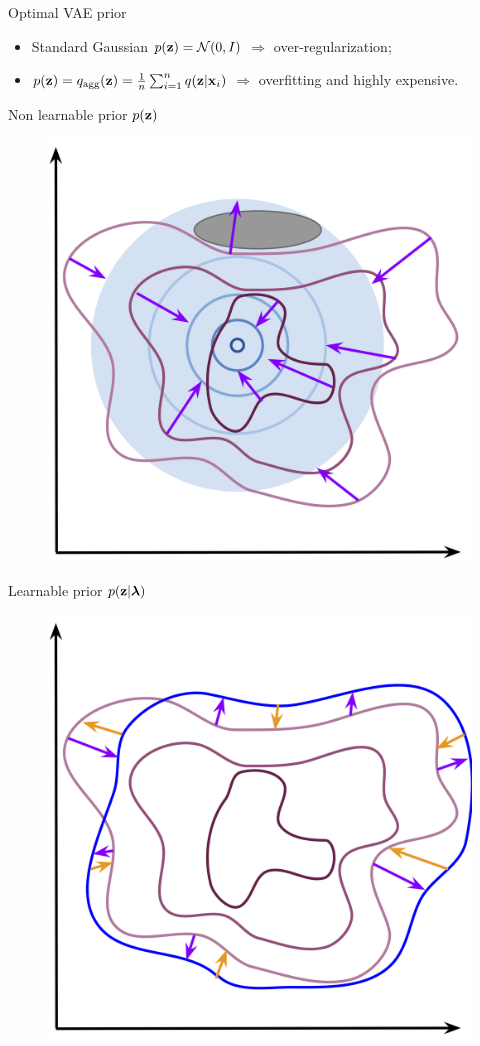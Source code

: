 \begin{frame}{Optimal VAE prior}
	\begin{itemize}
		\item Standard Gaussian $p(\mathbf{z}) = \mathcal{N}(0, I)$ $\Rightarrow$ over-regularization;
		\item $p(\mathbf{z}) = q_{\text{agg}}(\mathbf{z}) = \frac{1}{n}\sum_{i=1}^n q(\mathbf{z} | \mathbf{x}_i)$ $\Rightarrow$ overfitting and highly expensive.
	\end{itemize}
	\vspace{-0.5cm}
	\begin{minipage}[t]{0.5\columnwidth}
		\begin{block}{Non learnable prior $p(\mathbf{z})$}
			\begin{figure}[h]
				\centering
				\includegraphics[width=0.6\linewidth]{figs/non_learnable_prior}
			\end{figure}
		\end{block}
	\end{minipage}%
	\begin{minipage}[t]{0.5\columnwidth}
		\begin{block}{Learnable prior $p(\mathbf{z} | \boldsymbol{\lambda})$}
			\begin{figure}[h]
				\centering
				\includegraphics[width=0.6\linewidth]{figs/learnable_prior}

\end{figure}
\end{block}
\end{minipage}
\end{frame}

